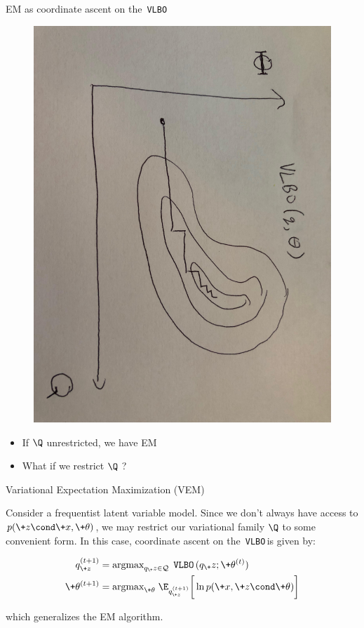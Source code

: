\documentclass[10pt]{beamer}
\newcommand{\VLBO}{\,\texttt{VLBO}\,}
\begin{document}
\begin{frame}{EM as coordinate ascent on the \VLBO }

	\begin{figure}
	\includegraphics[width=.55\textwidth, angle=90]{images/em_is_perfect_vi.jpg}
	\end{figure}

 
\begin{itemize}
\item If $\Q$ unrestricted, we have EM   
\item What if we restrict $\Q$ ?
\end{itemize}

\end{frame}


\begin{frame}{Variational Expectation Maximization (VEM)}

Consider a \alert{frequentist latent variable model}. Since we don't always have access to $p(\+z \cond \+x, \+\theta)$, we may restrict our variational family $\Q$ to some convenient form.  In this case, 
coordinate ascent on the \VLBO is given by:

\begin{align*}
q_{\+z}^{(t+1)} &= \text{argmax}_{q_\+z \in \mathcal{Q}} \; \VLBO  (q_\+z ; \+\theta^{(t)} )\label{ve_update} \\ 
\+\theta^{(t+1)} &= \text{argmax}_{\+\theta} \; \E_{q_{\+z}^{(t+1)}} \bigg[ \ln p(\+x, \+z \cond \+\theta) \bigg]
\end{align*} 

which generalizes the EM algorithm. %
\end{frame}
\end{document}
